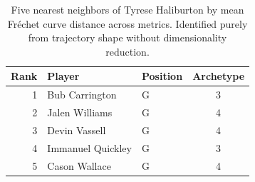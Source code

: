 \begin{table}[htbp]
  \centering\small
  \begin{tabular}{rllc}
    \toprule
    Rank & Player & Position & Archetype \\
    \midrule
    1 & Bub Carrington & G & 3 \\
    2 & Jalen Williams & G & 4 \\
    3 & Devin Vassell & G & 4 \\
    4 & Immanuel Quickley & G & 3 \\
    5 & Cason Wallace & G & 4 \\
    \bottomrule
  \end{tabular}
  \caption{Five nearest neighbors of Tyrese Haliburton by mean Fr\'{e}chet curve distance across metrics. Identified purely from trajectory shape without dimensionality reduction.}
  \label{tab:Tyrese_Haliburton_frechet_curve_neighbors}
\end{table}

